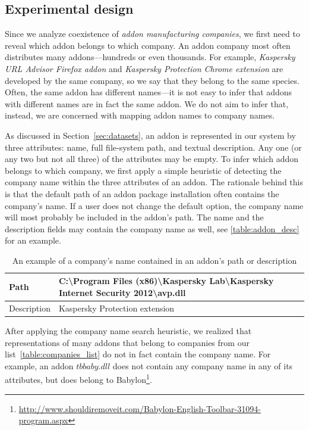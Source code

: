 \documentclass[ijoc,nonblindrev]{informs3} %
\numberwithin{equation}{subsection}
\begin{document}
\subsection{Experimental design}
\label{sec:experiment_des}

Since we analyze coexistence of \emph{addon manufacturing companies}, we first need to reveal which addon belongs to which company. An addon company most often distributes many addons---hundreds or even thousands. For example, \emph{Kaspersky URL Advisor Firefox addon} and \emph{Kaspersky Protection Chrome extension} are developed by the same company, so we say that they belong to the same species. Often, the same addon has different names---it is not easy to infer that addons with different names are in fact the same addon. We do not aim to infer that, instead, we are concerned with mapping addon names to company names. 

As discussed in Section~\ref{sec:datasets}, an addon is represented in our system by three attributes: name, full file-system path, and textual description. Any one (or any two but not all three) of the attributes may be empty. To infer which addon belongs to which company, we first apply a simple heuristic of detecting the company name within the three attributes of an addon. The rationale behind this is that the default path of an addon package installation often contains the company's name. If a user does not change the default option, the company name will most probably be included in the addon's path. The name and the description fields may contain the company name as well, see \autoref{table:addon_desc} for an example.

\begin{table}[!htbp]
\small
\centering
\caption{An example of a company's name contained in an addon's path or description}
\label{table:addon_desc}
\begin{tabular}{@{}|l|l|@{}}
\toprule
Path & C:\textbackslash{Program Files (x86)}\textbackslash{Kaspersky Lab}\textbackslash{Kaspersky Internet Security 2012}\textbackslash{avp.dll} \\ \midrule
Description & Kaspersky Protection extension \\ \bottomrule
\end{tabular}
\end{table}

After applying the company name search heuristic, we realized that representations of many addons that belong to companies from our list~\autoref{table:companies_list} do not in fact contain the company name. For example, an addon $tbbaby.dll$ does not contain any company name in any of its attributes, but does belong to Babylon\footnote{\url{http://www.shouldiremoveit.com/Babylon-English-Toolbar-31094-program.aspx}}.
\end{document}
